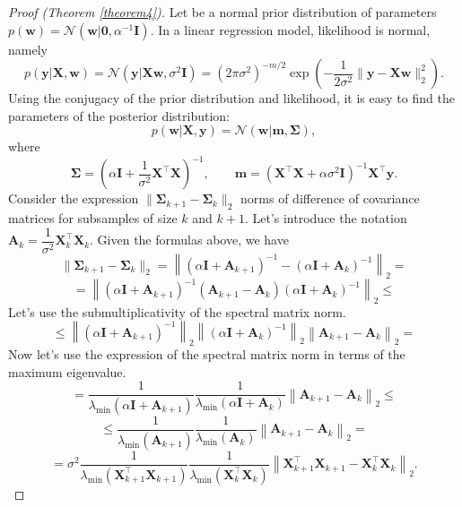 \documentclass[
11pt,%
tightenlines,%
twoside,%
onecolumn,%
nofloats,%
nobibnotes,%
nofootinbib,%
superscriptaddress,%
noshowpacs,%
centertags]%
{revtex4-2}
\begin{document}
\begin{proof}[Proof (Theorem \ref{theorem4})]
Let be a normal prior distribution of parameters $p(\mathbf{w})=\mathcal{N}\left(\mathbf{w}|\mathbf{0}, \alpha^{-1}\mathbf{I}\right)$. In a linear regression model, likelihood is normal, namely
    \[ p(\mathbf{y} | \mathbf{X}, \mathbf{w}) = \mathcal{N}\left(\mathbf{y} |\mathbf{X}\mathbf{w}, \sigma^2\mathbf{I}\right) =\left( 2\pi\sigma^2\right)^{-m/2} \exp\left( -\dfrac{1}{2\sigma^2} \|\mathbf{y} - \mathbf{X}\mathbf{w}\|_2^2\right). \]
Using the conjugacy of the prior distribution and likelihood, it is easy to find the parameters of the posterior distribution:
    \[ p(\mathbf{w} | \mathbf{X}, \mathbf{y}) = \mathcal{N}\left(\mathbf{w} | \mathbf{m}, \mathbf{\Sigma} \right), \]
where
    \[ \mathbf{\Sigma} = \left( \alpha \mathbf{I} + \dfrac{1}{\sigma^2} \mathbf{X}^{\top} \mathbf{X} \right)^{-1}, \qquad \mathbf{m} = \left( \mathbf{X}^{\top} \mathbf{X} + \alpha \sigma^2 \mathbf{I} \right)^{-1} \mathbf{X}^{\top} \mathbf{y}. \]
Consider the expression $\|\mathbf{\Sigma}_{k+1} - \mathbf{\Sigma}_k\|_2$ norms of difference of covariance matrices for subsamples of size $k$ and $k+1$. Let's introduce the notation $\mathbf{A}_k = \dfrac{1}{\sigma^2}\mathbf{X}^{\top}_k\mathbf{X}_k$. Given the formulas above, we have
    \[ \| \mathbf{\Sigma}_{k+1} - \mathbf{\Sigma}_k \|_2 = \left\| \left( \alpha \mathbf{I} + \mathbf{A}_{k+1} \right)^{-1} - \left( \alpha \mathbf{I} + \mathbf{A}_k \right)^{-1} \right\|_2 = \]
    \[ = \left\| \left( \alpha \mathbf{I} + \mathbf{A}_{k+1} \right)^{-1} \left( \mathbf{A}_{k+1} - \mathbf{A}_k \right) \left( \alpha \mathbf{I} + \mathbf{A}_k \right)^{-1} \right\|_2 \leqslant \]
    Let's use the submultiplicativity of the spectral matrix norm.
    \[ \leqslant \left\| \left( \alpha \mathbf{I} + \mathbf{A}_{k+1} \right)^{-1} \right\|_2 \left\| \left( \alpha \mathbf{I} + \mathbf{A}_k \right)^{-1} \right\|_2 \left\| \mathbf{A}_{k+1} - \mathbf{A}_k \right\|_2 = \]
    Now let's use the expression of the spectral matrix norm in terms of the maximum eigenvalue.
    \[ = \dfrac{1}{\lambda_{\min}\left( \alpha \mathbf{I} + \mathbf{A}_{k+1} \right)} \dfrac{1}{\lambda_{\min}\left( \alpha \mathbf{I} + \mathbf{A}_k \right)} \left\| \mathbf{A}_{k+1} - \mathbf{A}_k \right\|_2 \leqslant \]
    \[ \leqslant \dfrac{1}{\lambda_{\min}\left( \mathbf{A}_{k+1} \right)} \dfrac{1}{\lambda_{\min}\left( \mathbf{A}_k \right)} \left\| \mathbf{A}_{k+1} - \mathbf{A}_k \right\|_2 = \]
    \[ = \sigma^2  \dfrac{1}{\lambda_{\min}\left( \mathbf{X}^{\top}_{k+1} \mathbf{X}_{k+1} \right)} \dfrac{1}{\lambda_{\min}\left( \mathbf{X}^{\top}_k \mathbf{X}_k \right)} \left\| \mathbf{X}^{\top}_{k+1} \mathbf{X}_{k+1} - \mathbf{X}^{\top}_k \mathbf{X}_k \right\|_2. \]

\end{proof}
\end{document}
